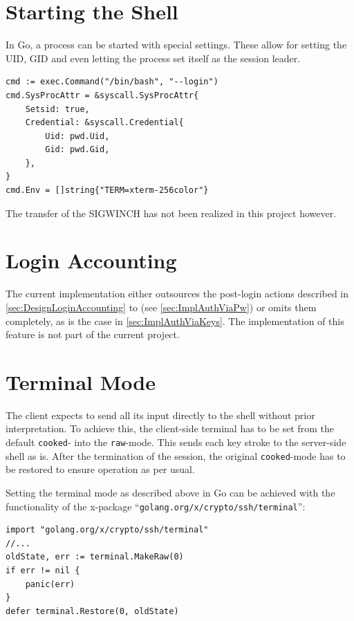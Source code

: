 \documentclass[10pt,a4paper,titlepage,twoside,english,final]{zhawreprt}
\begin{document}
\section{Starting the Shell}\label{sec:ImplStartingTheShell}
In \gls{Go}, a process can be started with special settings.
These allow for setting the \gls{UID}, \gls{GID} and even letting the process set itself as the session leader.

\setlistingGo
\begin{lstlisting}[caption={Starting a process in \gls{Go}},label=lst:StartingAProcessInGo]
cmd := exec.Command("/bin/bash", "--login")
cmd.SysProcAttr = &syscall.SysProcAttr{
	Setsid: true,
	Credential: &syscall.Credential{
		Uid: pwd.Uid,
		Gid: pwd.Gid,
	},
}
cmd.Env = []string{"TERM=xterm-256color"}
\end{lstlisting}

The transfer of the \gls{SIGWINCH} has not been realized in this project however.


\section{Login Accounting}\label{sec:ImplLoginAccounting}
The current implementation either outsources the post-\gls{login} actions described in \ref{sec:DesignLoginAccounting} to \cite{login}(see \ref{sec:ImplAuthViaPw}) or omits them completely, as is the case in \ref{sec:ImplAuthViaKeys}.
The implementation of this feature is not part of the current project.

\section{Terminal Mode}\label{sec:ImplTerminalMode}
The client expects to send all its input directly to the \gls{shell} without prior interpretation.
To achieve this, the client-side \gls{terminal} has to be set from the default \texttt{cooked}- into the \texttt{raw}-mode\citep[p.1309]{KerriskTLPI}.
This sends each key stroke to the server-side \gls{shell} as is.
After the termination of the session, the original \texttt{cooked}-mode has to be restored to ensure operation as per usual.

Setting the \gls{terminal} mode as described above in \gls{Go} can be achieved with the functionality of the x-package ``\texttt{golang.org/x/crypto/ssh/terminal}'':
\setlistingGo
\begin{lstlisting}[caption={Setting the \gls{terminal} mode in \gls{Go}},label=lst:GoTermMode]
import "golang.org/x/crypto/ssh/terminal"
//...
oldState, err := terminal.MakeRaw(0)
if err != nil {
	panic(err)
}
defer terminal.Restore(0, oldState)
\end{lstlisting}
\end{document}
